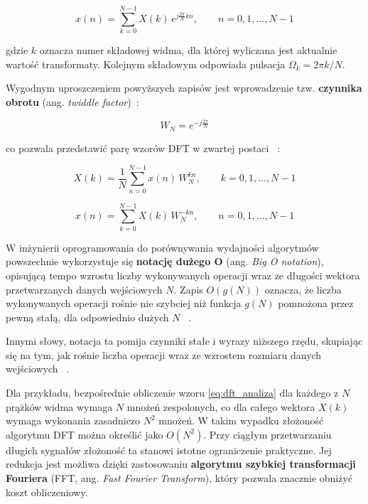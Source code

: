 \begin{equation}
x(n) = \sum_{k=0}^{N-1} X(k)\, e^{j\frac{2\pi}{N}kn},
\qquad n = 0, 1, \dots, N-1
\end{equation}

gdzie $k$ oznacza numer składowej widma, dla której wyliczana jest aktualnie wartość transformaty. Kolejnym składowym odpowiada pulsacja $\Omega_k = 2\pi k/N$.

Wygodnym uproszczeniem powyższych zapisów jest wprowadzenie tzw. \textbf{czynnika obrotu} (ang. \textit{twiddle factor})~\cite{CormenIntroductionAlgorithms}:

\begin{equation}
W_N = e^{-j\frac{2\pi}{N}}
\label{eq:twiddle}
\end{equation}

co pozwala przedstawić parę wzorów DFT w zwartej postaci ~\cite{ZielinskiDSP}:

\begin{equation}
X(k) = \frac{1}{N}\sum_{n=0}^{N-1} x(n)\, W_N^{kn},
\qquad k = 0, 1, \dots, N-1
\label{eq:dft_analiza_wn}
\end{equation}

\begin{equation}
x(n) = \sum_{k=0}^{N-1} X(k)\, W_N^{-kn},
\qquad n = 0, 1, \dots, N-1
\label{eq:dft_synteza_wn}
\end{equation}


W inżynierii oprogramowania do porównywania wydajności algorytmów powszechnie wykorzystuje się \textbf{notację dużego O} (ang. \textit{Big O notation}), opisującą tempo wzrostu liczby wykonywanych operacji wraz ze długości wektora przetwarzanych danych wejściowych $N$. Zapis $O(g(N))$ oznacza, że liczba wykonywanych operacji rośnie nie szybciej niż funkcja $g(N)$ pomnożona przez pewną stałą, dla odpowiednio dużych $N$ ~\cite{CormenIntroductionAlgorithms}.

Innymi słowy, notacja ta pomija czynniki stałe i wyrazy niższego rzędu, skupiając się na tym, jak rośnie liczba operacji wraz ze wzrostem rozmiaru danych wejściowych ~\cite{CormenIntroductionAlgorithms}.

Dla przykładu, bezpośrednie obliczenie wzoru \eqref{eq:dft_analiza} dla każdego z $N$ prążków widma wymaga $N$ mnożeń zespolonych, co dla całego wektora $X(k)$ wymaga wykonania zasadniczo $N^2$ mnożeń. W takim wypadku złożoność algorytmu DFT można określić jako $O(N^2)$. Przy ciągłym przetwarzaniu długich sygnałów złożoność ta stanowi istotne ograniczenie praktyczne. Jej redukcja jest możliwa dzięki zastosowaniu \textbf{algorytmu szybkiej transformacji Fouriera} (FFT, ang. \textit{Fast Fourier Transform}), który pozwala znacznie obniżyć koszt obliczeniowy.

